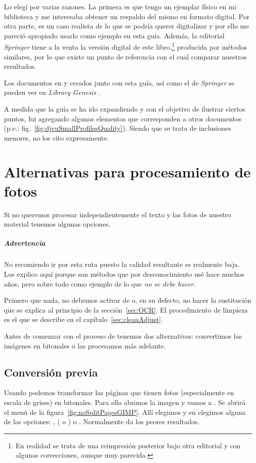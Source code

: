 \documentclass[%
	a5paper,
	10pt,
	twoside,
	openright,
	final,
]{memoir}
\begin{document}
{	Lo elegí por varias razones. La primera es que tengo un ejemplar físico en mi biblioteca y me interesaba obtener un respaldo del mismo en formato digital. Por otra parte, es un caso realista de lo que se podría querer digitalizar y por ello me pareció apropiado usarlo como ejemplo en esta guía. Además, la editorial \emph{Springer} tiene a la venta la versión digital de este libro,\footnote{En realidad se trata de una reimpresión posterior bajo otra editorial y con algunas correcciones, aunque muy parecida.} producida por métodos similares, por lo que existe un punto de referencia con el cual comparar nuestros resultados.

	Los documentos en \pdf \cite{miGregoryPDF} y \djvu \cite{miGregoryDjVu} creados junto con esta guía, así como el \pdf de \emph{Springer} \cite{SpringerGregoryPDF} se pueden ver en \emph{Library Genesis} \cite{LibGen}.

	A medida que la guía se ha ido expandiendo y con el objetivo de ilustrar ciertos puntos, fui agregando algunos elementos que corresponden a otros documentos (p.e.: fig.~\ref{fig:djvuSmallProfilesQuality}). Siendo que se trata de inclusiones menores, no los cito expresamente.

	\chapter{Alternativas para procesamiento de fotos\label{sec:noSplitPages}} Si no queremos procesar independientemente el texto y las fotos de nuestro material tenemos algunas opciones.

	\paragraph{Advertencia} No recomiendo ir por esta ruta puesto la calidad resultante es realmente baja. Los explico aquí porque son métodos que por desconocimiento usé hace muchos años, pero sobre todo como ejemplo de lo que \emph{no se debe hacer}.

	Primero que nada, no debemos activar  de \scantailor o, en su defecto, no hacer la sustitución que se explica al principio de la sección~\ref{sec:OCR}. El procedimiento de limpieza es el que se describe en el capítulo~\ref{sec:cleanAdjust}.

	Antes de comenzar con el proceso de \ocr tenemos dos alternativas: convertimos las imágenes en bitonales o las procesamos más adelante.

	\section{Conversión previa} Usando \gimp podemos transformar las páginas que tienen fotos (especialmente en escala de grises) en bitonales. Para ello abrimos la imagen y vamos a . Se abrirá el menú de la figura~\ref{fig:noSplitPagesGIMP}. Allí elegimos  y en  elegimos alguna de las opciones: ,  ( o ) o . Normalmente  da los peores resultados.

}
\end{document}
